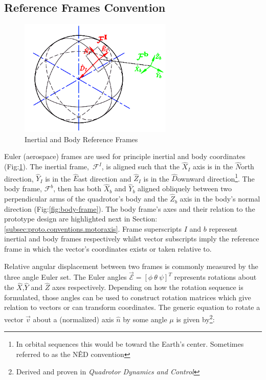 \subsection{Reference Frames Convention}
\label{subsec:proto.conventions.frames}
\begin{figure}[htbp]
\centering
\includegraphics[width=0.65\textwidth]{figs/reference-frame}
\caption{Inertial and Body Reference Frames}
\label{fig:ref_frame}
\end{figure}
Euler (aerospace) frames are used for principle inertial and body coordinates (Fig:\ref{fig:ref_frame}). The inertial frame,~$\mathcal{F}^I$, is aligned such that the $\hat{X}_I$ axis is in the $\hat{N}$orth direction, $\hat{Y}_I$ is in the $\hat{E}$ast direction and $\hat{Z}_I$ is  in the $\hat{D}$ownward direction\footnote{In orbital sequences this would be toward the Earth's center. Sometimes referred to as the N\^{E}D convention}. The body frame, $\mathcal{F}^b$, then has both $\hat{X}_b$ and $\hat{Y}_b$ aligned obliquely between two perpendicular arms of the quadrotor's body and the $\hat{Z}_b$ axis in the body's normal direction (Fig:\ref{fig:body-frame}). The body frame's axes and their relation to the prototype design are highlighted next in Section:\ref{subsec:proto.conventions.motoraxis}. Frame superscripts $I$ and $b$ represent inertial and body frames respectively whilst vector subscripts imply the reference frame in which the vector's coordinates exists or taken relative to.
\par
Relative angular displacement between two frames is commonly measured by the three angle Euler set. The Euler angles $\vec{\mathcal{E}}=[\phi ~\theta ~\psi]^T$ represents rotations about the $\hat{X}$,$\hat{Y}$ and $\hat{Z}$ axes respectively. Depending on how the rotation sequence is formulated, those angles can be used to construct rotation matrices which give relation to vectors or can transform coordinates. The generic equation to rotate a vector $\vec{v}$ about a (normalized) axis $\hat{n}$ by some angle $\mu$ is given by\footnote{Derived and proven in \emph{Quadrotor Dynamics and Control}\cite{quaddynamics}}:
